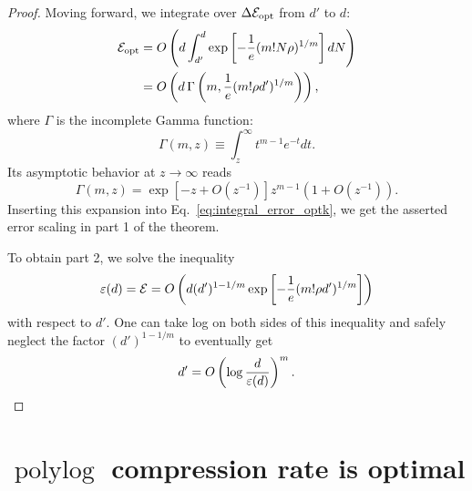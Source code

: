 \documentclass{article}
\theoremstyle{plain}
\def\REV#1{{\color[HTML]{000000}#1}}
\begin{document}
\begin{proof}
Moving forward, we integrate over $\Delta \mathcal{E}_{\rm opt}$ from $d'$ to $d$:
\begin{equation}    \label{eq:integral_error_optk}
    \begin{aligned}
        \mathcal{E}_{\rm opt}
        &= O\left( d \int_{d'}^d  \exp\left[ -\frac{1}{e} (m!N\rho)^{1/m} \right] dN \right) \\
        &= O\left( d\, \Gamma\left( m, \frac{1}{e} (m!\rho d')^{1/m} \right) \right)    ,
    \end{aligned}
\end{equation}
where $\Gamma$ is the incomplete Gamma function: 
\begin{equation}
    \Gamma(m,z) \equiv \int_z^\infty t^{m-1}e^{-t} dt    .
\end{equation}
Its asymptotic behavior at $z\to\infty$ reads
\begin{equation}
    \Gamma(m,z) = \exp\left[ -z+O(z^{-1}) \right] z^{m-1} \left( 1 + O(z^{-1}) \right) .
\end{equation}
Inserting this expansion into Eq.~\eqref{eq:integral_error_optk}, we get the asserted error scaling in part 1 of the theorem. 

To obtain part 2, we solve the inequality
\begin{equation}
    \REV{\varepsilon}(d) = \mathcal{E} 
    = O\left( d (d')^{1-1/m} \exp\left[ -\frac{1}{e}(m!\rho d')^{1/m} \right] \right)
\end{equation}
with respect to $d'$. One can take log on both sides of this inequality and safely neglect the factor $(d')^{1-1/m}$ to eventually get
\begin{equation}
    d' = O\left( \log\frac{d}{\REV{\varepsilon}(d)} \right)^m .
\end{equation}
\end{proof}



\section{$\operatorname{polylog}$ compression rate is optimal}
\label{app:optimality}
\end{document}
